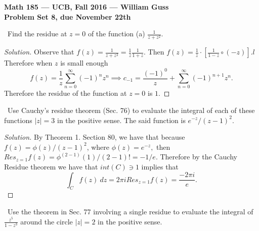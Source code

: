\documentclass[11pt]{amsart}
\theoremstyle{definition}
\numberwithin{theorem}{section}
\numberwithin{definition}{section}
\numberwithin{equation}{section}
\newenvironment{solution}
  {\begin{proof}[Solution]}
  {\end{proof}}
\begin{document}
\begin{center}{\bf Math 185 --- UCB, Fall 2016 --- William Guss}
\\
{\bf Problem Set 8, due November 22th}
\end{center}
\medskip {}\ Find the residue at $z = 0$ of the function (a) $\frac{1}{z+z^2}.$
\begin{solution}
	Observe that $f(z) = \frac{1}{z+z^2} = \frac{1}{z}\frac{1}{1+z}.$ Then $f(z) = \frac{1}{z} \cdot \left[\frac{1}{1-z} \circ (-z)\right].l$ Therefore when $z$ is small enough
	\begin{equation*}
		f(z) = \frac{1}{z}\sum_{n=0}^\infty (-1)^n z^n \implies c_{-1} = \frac{(-1)^0}{z} + \sum_{n=0}^\infty (-1)^{n+1}z^n.
	\end{equation*}
	Therefore the residue of the function at $z = 0$ is $1.$
\end{solution}
\medskip {}\ Use Cauchy's residue theorem (Sec. 76) to evaluate the integral of each of these functions $|z| = 3$ in the positive sense.	The said function is $e^{-z}/(z-1)^2.$
\begin{solution}
	By Theorem 1. Section 80, we have that because $f(z) = \phi(z)/(z-1)^2$, where $\phi(z) = e^{-z},$ then
	$Res_{z=1} f(z) = \phi^{(2-1)}(1)/(2-1)! = -1/e.$ Therefore by the Cauchy Residue theorem we have that
	$int(C) \ni 1$ implies that
	\begin{equation*}
		\int_C f(z)\ dz = {2\pi i} Res_{z=1} f(z) = \frac{-2\pi i}{e}.
	\end{equation*}
\end{solution}
\medskip {}\ Use the theorem in Sec. 77 involving a single residue to evaluate the integral 
of $\frac{z^5}{1-z^3}$ around the circle $|z| = 2$ in the positive sense.
\end{document}
